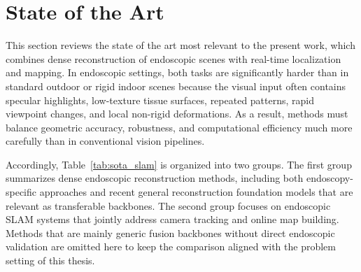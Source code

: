 \section{State of the Art}
\label{sec:sota}
This section reviews the state of the art most relevant to the present work, which combines dense reconstruction of endoscopic scenes with real-time localization and mapping. In endoscopic settings, both tasks are significantly harder than in standard outdoor or rigid indoor scenes because the visual input often contains specular highlights, low-texture tissue surfaces, repeated patterns, rapid viewpoint changes, and local non-rigid deformations. As a result, methods must balance geometric accuracy, robustness, and computational efficiency much more carefully than in conventional vision pipelines.

Accordingly, Table~\ref{tab:sota_slam} is organized into two groups. The first group summarizes dense endoscopic reconstruction methods, including both endoscopy-specific approaches and recent general reconstruction foundation models that are relevant as transferable backbones. The second group focuses on endoscopic SLAM systems that jointly address camera tracking and online map building. Methods that are mainly generic fusion backbones without direct endoscopic validation are omitted here to keep the comparison aligned with the problem setting of this thesis.

